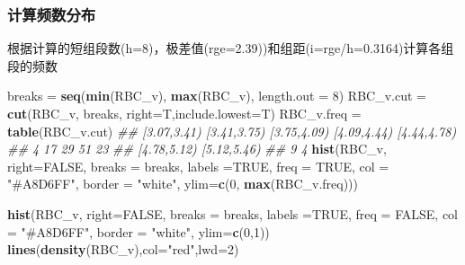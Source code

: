 \documentclass[
]{article}
\newenvironment{Shaded}{\begin{snugshade}}{\end{snugshade}}
\newcommand{\CommentTok}[1]{\textcolor[rgb]{0.56,0.35,0.01}{\textit{#1}}}
\newcommand{\DataTypeTok}[1]{\textcolor[rgb]{0.13,0.29,0.53}{#1}}
\newcommand{\DecValTok}[1]{\textcolor[rgb]{0.00,0.00,0.81}{#1}}
\newcommand{\KeywordTok}[1]{\textcolor[rgb]{0.13,0.29,0.53}{\textbf{#1}}}
\newcommand{\NormalTok}[1]{#1}
\newcommand{\OtherTok}[1]{\textcolor[rgb]{0.56,0.35,0.01}{#1}}
\newcommand{\StringTok}[1]{\textcolor[rgb]{0.31,0.60,0.02}{#1}}
\begin{document}
\hypertarget{ux8ba1ux7b97ux9891ux6570ux5206ux5e03}{%
\subsubsection{计算频数分布}\label{ux8ba1ux7b97ux9891ux6570ux5206ux5e03}}

根据计算的短组段数(h=8)，极差值(rge=2.39))和组距(i=rge/h=0.3164)计算各组段的频数

\begin{Shaded}
\begin{Highlighting}[]
\NormalTok{breaks =}\StringTok{ }\KeywordTok{seq}\NormalTok{(}\KeywordTok{min}\NormalTok{(RBC_v), }\KeywordTok{max}\NormalTok{(RBC_v), }\DataTypeTok{length.out =} \DecValTok{8}\NormalTok{)}
\NormalTok{RBC_v.cut =}\StringTok{ }\KeywordTok{cut}\NormalTok{(RBC_v, breaks, }\DataTypeTok{right=}\NormalTok{T,}\DataTypeTok{include.lowest=}\NormalTok{T)}
\NormalTok{RBC_v.freq =}\StringTok{ }\KeywordTok{table}\NormalTok{(RBC_v.cut)}
\CommentTok{## [3.07,3.41) [3.41,3.75) [3.75,4.09) [4.09,4.44) [4.44,4.78) }
\CommentTok{##          4          17          29          51          23 }
\CommentTok{## [4.78,5.12) [5.12,5.46) }
\CommentTok{##          9           4 }
\KeywordTok{hist}\NormalTok{(RBC_v, }\DataTypeTok{right=}\OtherTok{FALSE}\NormalTok{, }
     \DataTypeTok{breaks =}\NormalTok{ breaks, }\DataTypeTok{labels =}\OtherTok{TRUE}\NormalTok{, }
     \DataTypeTok{freq =} \OtherTok{TRUE}\NormalTok{, }\DataTypeTok{col =} \StringTok{"#A8D6FF"}\NormalTok{, }
     \DataTypeTok{border =} \StringTok{"white"}\NormalTok{, }\DataTypeTok{ylim=}\KeywordTok{c}\NormalTok{(}\DecValTok{0}\NormalTok{, }\KeywordTok{max}\NormalTok{(RBC_v.freq))) }

\KeywordTok{hist}\NormalTok{(RBC_v, }\DataTypeTok{right=}\OtherTok{FALSE}\NormalTok{, }
      \DataTypeTok{breaks =}\NormalTok{ breaks, }\DataTypeTok{labels =}\OtherTok{TRUE}\NormalTok{, }
      \DataTypeTok{freq =} \OtherTok{FALSE}\NormalTok{, }\DataTypeTok{col =} \StringTok{"#A8D6FF"}\NormalTok{, }
      \DataTypeTok{border =} \StringTok{"white"}\NormalTok{, }\DataTypeTok{ylim=}\KeywordTok{c}\NormalTok{(}\DecValTok{0}\NormalTok{,}\DecValTok{1}\NormalTok{))}
\KeywordTok{lines}\NormalTok{(}\KeywordTok{density}\NormalTok{(RBC_v),}\DataTypeTok{col=}\StringTok{"red"}\NormalTok{,}\DataTypeTok{lwd=}\DecValTok{2}\NormalTok{)}
\end{Highlighting}
\end{Shaded}
\end{document}
